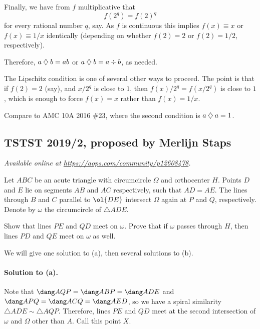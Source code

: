 \documentclass[11pt]{scrartcl}
\begin{document}
Finally, we have from $f$ multiplicative that
\[ f(2^q) = f(2)^q \]
for every rational number $q$, say.
As $f$ is continuous
this implies $f(x) \equiv x$ or $f(x) \equiv 1/x$ identically
(depending on whether $f(2) = 2$ or $f(2)=1/2$, respectively).

Therefore, $a \mathbin{\diamondsuit} b = ab$ or $a \mathbin{\diamondsuit} b = a \div b$, as needed.

\begin{remark*}
  The Lipschitz condition is one of several other ways to proceed.
  The point is that if $f(2) = 2$ (say),
  and $x/2^q$ is close to $1$,
  then $f(x)/2^q = f(x/2^q)$ is close to $1$,
  which is enough to force $f(x) = x$ rather than $f(x) = 1/x$.
\end{remark*}

\begin{remark*}
  Compare to AMC 10A 2016 \#23,
  where the second condition is $a \mathbin{\diamondsuit} a = 1$.
\end{remark*}
\pagebreak

\subsection{TSTST 2019/2, proposed by Merlijn Staps}
\textsl{Available online at \url{https://aops.com/community/p12608478}.}
\begin{mdframed}[style=mdpurplebox,frametitle={Problem statement}]
Let $ABC$ be an acute triangle with circumcircle $\Omega$
and orthocenter $H$.
Points $D$ and $E$ lie on segments $AB$ and $AC$
respectively, such that $AD = AE$.
The lines through $B$ and $C$ parallel to $\ol{DE}$
intersect $\Omega$ again at $P$ and $Q$, respectively.
Denote by $\omega$ the circumcircle of $\triangle ADE$.
\begin{enumerate}[(a)]
  \ii Show that lines $PE$ and $QD$ meet on $\omega$.
  \ii Prove that if $\omega$ passes through $H$,
  then lines $PD$ and $QE$ meet on $\omega$ as well.
\end{enumerate}
\end{mdframed}
We will give one solution to (a),
then several solutions to (b).

\paragraph{Solution to (a).}
Note that $\dang AQP = \dang ABP = \dang ADE$
and $\dang APQ = \dang ACQ = \dang AED$,
so we have a spiral similarity $\triangle ADE \sim \triangle AQP$.
Therefore, lines $PE$ and $QD$ meet at the second
intersection of $\omega$ and $\Omega$ other than $A$.
Call this point $X$.
\end{document}
